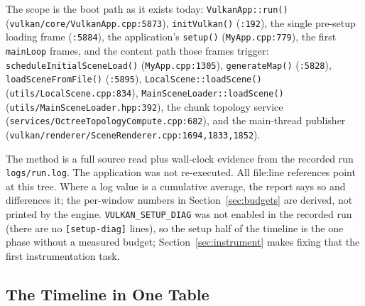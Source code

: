 \documentclass[11pt,a4paper]{article}
\begin{document}
The scope is the boot path as it exists today: \texttt{VulkanApp::run()}
(\texttt{vulkan/core/VulkanApp.cpp:5873}), \texttt{initVulkan()}
(\texttt{:192}), the single pre-setup loading frame (\texttt{:5884}), the
application's \texttt{setup()} (\texttt{MyApp.cpp:779}), the first
\texttt{mainLoop} frames, and the content path those frames trigger:
\texttt{scheduleInitialSceneLoad()} (\texttt{MyApp.cpp:1305}),
\texttt{generateMap()} (\texttt{:5828}), \texttt{loadSceneFromFile()}
(\texttt{:5895}), \texttt{LocalScene::loadScene()}
(\texttt{utils/LocalScene.cpp:834}), \texttt{MainSceneLoader::loadScene()}
(\texttt{utils/MainSceneLoader.hpp:392}), the chunk topology service
(\texttt{services/OctreeTopologyCompute.cpp:682}), and the main-thread
publisher (\texttt{vulkan/renderer/SceneRenderer.cpp:1694,1833,1852}).

The method is a full source read plus wall-clock evidence from the recorded
run \texttt{logs/run.log}. The application was not re-executed. All
file:line references point at this tree. Where a log value is a cumulative
average, the report says so and differences it; the per-window numbers in
Section~\ref{sec:budgets} are derived, not printed by the engine.
\texttt{VULKAN\_SETUP\_DIAG} was not enabled in the recorded run (there are no
\texttt{[setup-diag]} lines), so the setup half of the timeline is the one
phase without a measured budget; Section~\ref{sec:instrument} makes fixing
that the first instrumentation task.

\subsection{The Timeline in One Table}
\end{document}
